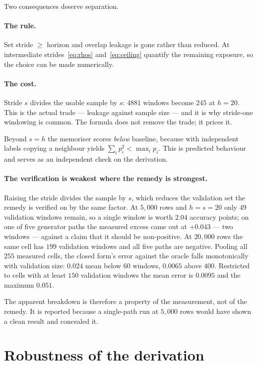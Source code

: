 \documentclass[11pt,a4paper]{article}
\begin{document}
Two consequences deserve separation.

\paragraph{The rule.} Set stride $\geq$ horizon and overlap leakage is gone
rather than reduced. At intermediate strides~\eqref{eq:rhos}
and~\eqref{eq:ceiling} quantify the remaining exposure, so the choice can be
made numerically.

\paragraph{The cost.} Stride $s$ divides the usable sample by $s$: $4881$
windows become $245$ at $h=20$. This is the actual trade --- leakage against
sample size --- and it is why stride-one windowing is common. The formula does
not remove the trade; it prices it.

Beyond $s=h$ the memoriser scores \emph{below} baseline, because with
independent labels copying a neighbour yields $\sum_i p_i^2 < \max_i p_i$. This
is predicted behaviour and serves as an independent check on the derivation.

\paragraph{The verification is weakest where the remedy is strongest.} Raising
the stride divides the sample by $s$, which reduces the validation set the
remedy is verified on by the same factor. At $5{,}000$ rows and $h=s=20$ only
$49$ validation windows remain, so a single window is worth $2.04$ accuracy
points; on one of five generator paths the measured excess came out at
$+0.043$ --- two windows --- against a claim that it should be non-positive. At
$20{,}000$ rows the same cell has $199$ validation windows and all five paths
are negative. Pooling all $255$ measured cells, the closed form's error against
the oracle falls monotonically with validation size: $0.024$ mean below $60$
windows, $0.0065$ above $400$. Restricted to cells with at least $150$
validation windows the mean error is $0.0095$ and the maximum $0.051$.

The apparent breakdown is therefore a property of the measurement, not of the
remedy. It is reported because a single-path run at $5{,}000$ rows would have
shown a clean result and concealed it.

\section{Robustness of the derivation}
\label{sec:robust}
\end{document}
